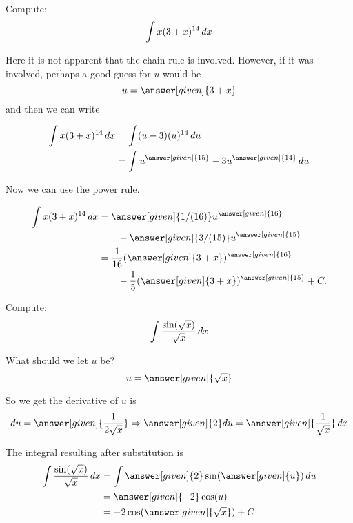 \documentclass{ximera}
\begin{document}
\begin{example}
  Compute:
\[
\int x(3+x)^{14}\mathop{}\!d x
\]
\begin{explanation}
Here it is not apparent that the chain rule is involved. However, if
it was involved, perhaps a good guess for $u$ would be
\[
u = \answer[given]{3+x}
\]
and then we can write

\begin{align*}
    \int x(3+x)^{14}\d x &= \int(u-3)(u)^{14}\d u\\
    &= \int u^{\answer[given]{15}}-3u^{\answer[given]{14}}\d u
\end{align*}

Now we can use the power rule.

\begin{align*}
    \int x(3+x)^{14}\d x &= \answer[given]{1/(16)}u^{\answer[given]{16}}\\
    &\qquad -\answer[given]{3/(15)}u^{\answer[given]{15}}\\
    &= \frac{1}{16}(\answer[given]{3+x})^{\answer[given]{16}}\\
    &\qquad -\frac{1}{5}(\answer[given]{3+x})^{\answer[given]{15}}+C.
\end{align*}
\end{explanation}
\end{example}


\begin{example}
Compute:
\[
\int \frac{\sin(\sqrt{x})}{\sqrt{x}}\mathop{}\!d x
\]
\begin{explanation}
What should we let $u$ be?
\[
u = \answer[given]{\sqrt{x}}
\]

So we get the derivative of $u$ is 
\[
\d u = \answer[given]{\frac{1}{2\sqrt{x}}} \Rightarrow \answer[given]{2}du=\answer[given]{\frac{1}{\sqrt{x}}} \d x
\]

The integral resulting after substitution is
\begin{align*}
\int \frac{\sin(\sqrt{x})}{\sqrt{x}}\d x &= \int\answer[given]{2}\sin(\answer[given]{u})\d u\\
&= \answer[given]{-2}\cos(u)\\
&=-2\cos(\answer[given]{\sqrt{x}})+C
\end{align*}


\end{explanation}
\end{example}
\end{document}
